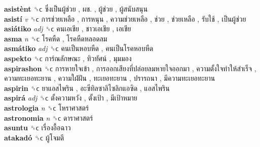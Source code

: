 \textbf{asistènt} ␝ϲ   ซึ่งเป็นผู้ช่วย ,  ผช. ,  ผู้ช่วย ,  ผู้สนับสนุน   \\
\textbf{asistí} \emph{v}  ␝ϲ   การช่วยเหลือ ,  การหนุน ,  ความช่วยเหลือ ,  ช่วย ,  ช่วยเหลือ ,  รับใช้ ,  เป็นผู้ช่วย   \\
\textbf{asiátiko} \emph{adj}  ␝ϲ   คนเอเชีย ,  ชาวเอเชีย ,  เอเชีย   \\
\textbf{asma} \emph{n}  ␝ϲ   โรคหืด ,  โรคหืดหลอดลม   \\
\textbf{asmátiko} \emph{adj}  ␝ϲ   คนเป็นหอบหืด ,  คนเป็นโรคหอบหืด   \\
\textbf{aspekto} ␝ϲ   การ์ณลักษณะ ,  ทิวทัศน์ ,  มุมมอง   \\
\textbf{aspirashon} ␝ϲ   การหายใจเข้า ,  การออกเสียงที่ปล่อยลมหายใจออกมา ,  ความตั้งใจทำให้สำเร็จ ,  ความทะเยอทะยาน ,  ความใฝ่ฝัน ,  ทะเยอทะยาน ,  ปรารถนา ,  มีความทะเยอทะยาน   \\
\textbf{aspirin} ␝ϲ   ยาแอสไพริน ,  อะซีทิลซาลิไซลิกแอซิด ,  แอสไพริน   \\
\textbf{aspirá} \emph{adj}  ␝ϲ   ตั้งความหวัง ,  ตั้งเป้า ,  มีเป้าหมาย   \\
\textbf{astrologia} \emph{n}  ␝ϲ   โหราศาสตร์   \\
\textbf{astronomia} \emph{n}  ␝ϲ   ดาราศาสตร์   \\
\textbf{asuntu} ␝ϲ   เรื่องอื้อฉาว   \\
\textbf{atakadó} ␝ϲ   ผู้โจมตี   \\
